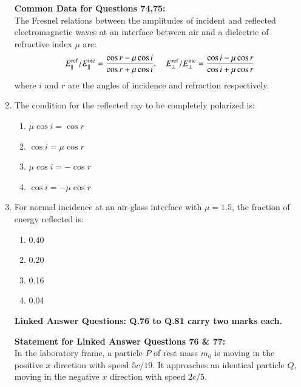 \documentclass[journal,12pt,onecolumn]{IEEEtran}
\begin{document}
\begin{enumerate}[itemsep = 1em]
\textbf{Common Data for Questions 74,75:} \\
The Fresnel relations between the amplitudes of incident and reflected electromagnetic waves at an interface between air and a dielectric of refractive index $\mu$ are:  
\[
E_\parallel^{\rm ref} / E_\parallel^{\rm inc} = \frac{\cos r - \mu \cos i}{\cos r + \mu \cos i}, \quad
E_\perp^{\rm ref} / E_\perp^{\rm inc} = \frac{\cos i - \mu \cos r}{\cos i + \mu \cos r}
\]  
where $i$ and $r$ are the angles of incidence and refraction respectively.


\item The condition for the reflected ray to be completely polarized is:

\hfill{}

\begin{multicols}{2}
\begin{enumerate}
    \item $\mu \cos i = \cos r$
    \item $\cos i = \mu \cos r$
    \item $\mu \cos i = - \cos r$
    \item $\cos i = - \mu \cos r$
\end{enumerate}
\end{multicols}

\item For normal incidence at an air-glass interface with $\mu=1.5$, the fraction of energy reflected is:

\hfill{}

\begin{multicols}{2}
\begin{enumerate}
    \item 0.40
    \item 0.20
    \item 0.16
    \item 0.04
\end{enumerate}
\end{multicols}

\newpage
\begin{center}
 \textbf{Linked Answer Questions: Q.76 to Q.81 carry two marks each.}   
\end{center}

\vspace{2em}


\textbf{Statement for Linked Answer Questions 76 \& 77:} \\
In the laboratory frame, a particle $P$ of rest mass $m_0$ is moving in the positive $x$ direction with speed $5c/19$. It approaches an identical particle $Q$, moving in the negative $x$ direction with speed $2c/5$.



\end{enumerate}
\end{document}

